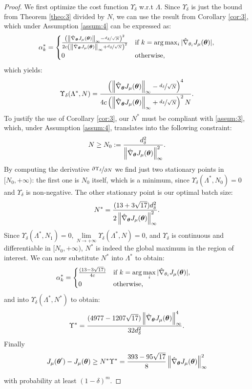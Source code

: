 \begin{proof}
We first optimize the cost function $\Upsilon_{\delta}$ w.r.t $\Lambda$. Since $\Upsilon_{\delta}$ is just the bound from Theorem \ref{theo:3} divided by $N$, we can use the result from Corollary \ref{cor:3}, which under Assumption \ref{assum:4} can be expressed as:
\[
\alpha_k^* = 
\begin{cases}
	\frac{
		\left(\norm[\infty]{\gradApp{\vtheta}} - \nicefrac{d_{\delta}}{\sqrt{N}}\right)^2}
		{2c
		\left(\norm[\infty]{\gradApp{\vtheta}} + \nicefrac{d_{\delta}}{\sqrt{N}}\right)^2} & 
		\text{if } k = \arg\max_i |\gradApp{\theta_i}|,	\\
		0 & \text{otherwise},
\end{cases}
\]
which yields:
\[
	\Upsilon_{\delta}(\Lambda^*,N) = 
	\frac{
		\left(\norm[\infty]{\gradApp{\vtheta}} - \nicefrac{d_{\delta}}{\sqrt{N}}\right)^4}
		{4c
		\left(\norm[\infty]{\gradApp{\vtheta}} + \nicefrac{d_{\delta}}{\sqrt{N}}\right)^2N}.
\]
To justify the use of Corollary \ref{cor:3}, our $N^*$ must be compliant with \ref{assum:3}, which, under Assumption \ref{assum:4}, translates into the following constraint:
\[
N \geq N_0 := \frac{d_{\delta}^2}{\norm[\infty]{\gradApp{\vtheta}}^2}.
\] 
By computing the derivative $\nicefrac{\partial\Upsilon_{\delta}}{\partial N}$ we find just two stationary points in $[N_0,+\infty)$: the first one is $N_0$ itself, which is a minimum, since $\Upsilon_{\delta}(\Lambda^*,N_0) = 0$ and $\Upsilon_{\delta}$ is non-negative. The other stationary point is our optimal batch size:
\[
	N^* =  \frac{(13+3\sqrt{17})d_{\delta}^2}{2\norm[\infty]{\gradApp{\vtheta}}^2}.
\]
Since $\Upsilon_{\delta}(\Lambda^*,N_1)=0, \lim\limits_{N \to +\infty}\Upsilon_{\delta} (\Lambda^*,N)= 0$, and $\Upsilon_{\delta}$ is continuous and differentiable in $[N_0,+\infty)$, $N^*$ is indeed the global maximum in the region of interest. We can now substitute $N^*$ into $\Lambda^*$ to obtain:
\begin{align*}
&\alpha_k^* = 
\begin{cases}  
	\frac{(13-3\sqrt{17})}
		{4c} & 
		\text{if } k = \arg\max\limits_i |\gradApp{\theta_i}|,	\\
		0 & \text{otherwise},
\end{cases}
\end{align*}
and into $\Upsilon_{\delta}(\Lambda^*,N^*)$ to obtain:
\[
	\Upsilon^* = \frac{(4977-1207\sqrt{17})\norm[\infty]{\gradApp{\vtheta}}^4}{32d_{\delta}^2}.
\]
Finally
\[
	\DeltaJ \geq N^*\Upsilon^* 
	= \frac{393-95\sqrt{17}}{8}\norm[\infty]{\gradApp{\vtheta}}^2
\]

with probability at least $(1-\delta)^m$.

\end{proof}


